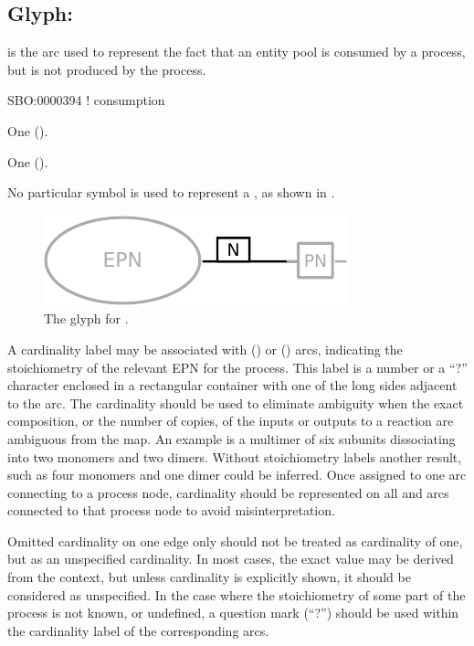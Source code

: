 \subsection{Glyph: }
\label{sec:consumption}

 is the arc used to represent the fact that an entity pool is consumed by a process, but is not produced by the process.

\begin{glyphDescription}

\glyphSboTerm
SBO:0000394 ! consumption

\glyphOrigin
One  ().

\glyphTarget
One  ().

\glyphSymbol
No particular symbol is used to represent a , as shown in .

\end{glyphDescription}

\begin{figure}[H]
  \centering
  \includegraphics{images/build/consumption.pdf}
  \caption{The \PD glyph for .}
  \label{fig:consumption}
\end{figure}

A cardinality label may be associated with  () or  () arcs, indicating the stoichiometry of the relevant EPN for the process.
This label is a number or a ``?'' character enclosed in a rectangular container with one of the long sides adjacent to the  arc.
The cardinality should be used to eliminate ambiguity when the exact composition, or the number of copies, of the inputs or outputs to a reaction are ambiguous from the map.
An example is a multimer of six subunits dissociating into two monomers and two dimers.
Without stoichiometry labels another result, such as four monomers and one dimer could be inferred.
Once assigned to one arc connecting to a process node, cardinality should be represented on all  and  arcs connected to that process node to avoid misinterpretation.

Omitted cardinality on one edge only should not be treated as cardinality of one, but as an unspecified cardinality.
In most cases, the exact value may be derived from the context, but unless cardinality is explicitly shown, it should be considered as unspecified.
In the case where the stoichiometry of some part of the process is not known, or undefined, a question mark (``?'') should be used within the cardinality label of the corresponding arcs.

